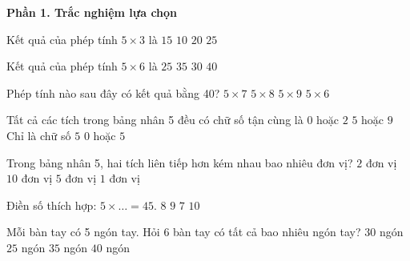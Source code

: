 \textbf{Phần 1. Trắc nghiệm lựa chọn}

\begin{ex} %
Kết quả của phép tính $5 \times 3$ là
\choice
{\True $15$}
{$10$}
{$20$}
{$25$}
\end{ex}

\begin{ex} %
Kết quả của phép tính $5 \times 6$ là
\choice
{$25$}
{$35$}
{\True $30$}
{$40$}
\end{ex}

\begin{ex} %
Phép tính nào sau đây có kết quả bằng 40?
\choice
{$5 \times 7$}
{\True $5 \times 8$}
{$5 \times 9$}
{$5 \times 6$}
\end{ex}

\begin{ex} %
Tất cả các tích trong bảng nhân 5 đều có chữ số tận cùng là
\choice
{$0$ hoặc $2$}
{$5$ hoặc $9$}
{Chỉ là chữ số $5$}
{\True $0$ hoặc $5$}
\end{ex}

\begin{ex} %
Trong bảng nhân 5, hai tích liên tiếp hơn kém nhau bao nhiêu đơn vị?
\choice
{$2$ đơn vị}
{$10$ đơn vị}
{\True $5$ đơn vị}
{$1$ đơn vị}
\end{ex}

\begin{ex} %
Điền số thích hợp: $5 \times \dots = 45$.
\choice
{$8$}
{\True $9$}
{$7$}
{$10$}
\end{ex}

\begin{ex} %
Mỗi bàn tay có 5 ngón tay. Hỏi 6 bàn tay có tất cả bao nhiêu ngón tay?
\choice
{\True $30$ ngón}
{$25$ ngón}
{$35$ ngón}
{$40$ ngón}
\end{ex}

